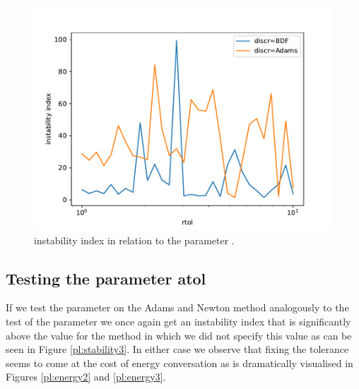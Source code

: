 \documentclass{report}
\begin{document}
\begin{figure}[h]
\centering
\begin{minipage}[b]{0.45\textwidth}
\centering
\includegraphics[width=\textwidth]{../Plots/Task4/Figure_304}
\caption{instability index in relation to the parameter .}
\label{pl:stability2}
\end{minipage}
\end{figure}

\subsection*{Testing the parameter atol}

If we test the  parameter on the Adams and Newton method analogously to the test of the  parameter we once again get an instability index that is significantly above the value for the method in which we did not specify this value as can be seen in Figure \ref{pl:stability3}. In either case we observe that fixing the tolerance seems to come at the cost of energy conversation as is dramatically visualised in Figures \ref{pl:energy2} and \ref{pl:energy3}.
\end{document}
